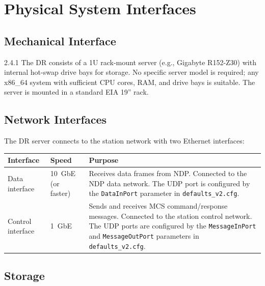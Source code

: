 
\chapter{Physical System Interfaces}
\label{sec:physical}

\section{Mechanical Interface}

\begin{newInVersion}{2.4.1}
The DR consists of a 1U rack-mount server (e.g., Gigabyte R152-Z30) with
internal hot-swap drive bays for storage.  No specific server model is required;
any x86\_64 system with sufficient CPU cores, RAM, and drive bays is suitable.
The server is mounted in a standard EIA 19'' rack.
\end{newInVersion}

\section{Network Interfaces}

The DR server connects to the station network with two Ethernet interfaces:

\begin{longtable}{l l p{7.5cm}}
\toprule
\textbf{Interface} & \textbf{Speed} & \textbf{Purpose} \\
\midrule
\endfirsthead
\endhead
\bottomrule
\endfoot

Data interface    & 10~GbE (or faster)  &
    Receives data frames from NDP.  Connected to the NDP data network.
    The UDP port is configured by the \texttt{DataInPort} parameter
    in \texttt{defaults\_v2.cfg}. \\

Control interface & 1~GbE              &
    Sends and receives MCS command/response messages.  Connected to the
    station control network.  The UDP ports are configured by the
    \texttt{MessageInPort} and \texttt{MessageOutPort} parameters
    in \texttt{defaults\_v2.cfg}. \\

\end{longtable}

\section{Storage}

